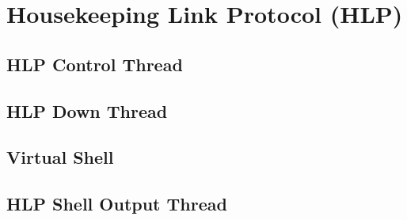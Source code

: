 %
\section{Housekeeping Link Protocol (HLP)}
\hrulefill
\subsection{HLP Control Thread}

\subsection{HLP Down Thread}

\subsection{Virtual Shell}

\subsection{HLP Shell Output Thread}

